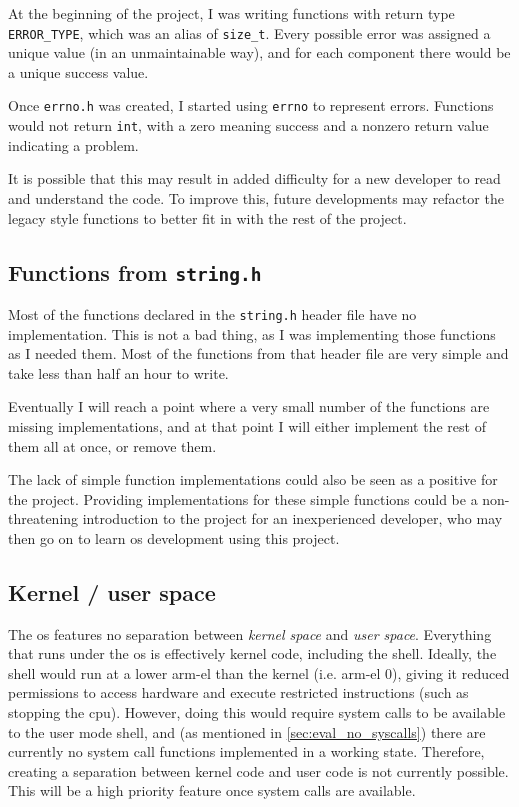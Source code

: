 \documentclass{article}
\begin{document}
At the beginning of the project, I was writing functions with return
type \verb!ERROR_TYPE!, which was an alias of \verb!size_t!. Every possible
error was assigned a unique value (in an unmaintainable way), and for each
component there would be a unique success value.

Once \texttt{errno.h} was created, I started using \texttt{errno} to represent
errors. Functions would not return \texttt{int}, with a zero meaning success
and a nonzero return value indicating a problem.

It is possible that this may result in added difficulty for a new developer to
read and understand the code. To improve this, future developments may refactor
the legacy style functions to better fit in with the rest of the project.

\subsection{Functions from \texttt{string.h}}
Most of the functions declared in the \texttt{string.h} header file have no
implementation. This is not a bad thing, as I was implementing those functions
as I needed them. Most of the functions from that header file are very simple
and take less than half an hour to write.

Eventually I will reach a point where a very small number of the functions are
missing implementations, and at that point I will either implement the rest of
them all at once, or remove them.

The lack of simple function implementations could also be seen as a positive
for the project. Providing implementations for these simple functions could be
a non-threatening introduction to the project for an inexperienced developer,
who may then go on to learn \gls{os} development using this project.

\subsection{Kernel / user space}
The \gls{os} features no separation between \emph{kernel space} and \emph{user
space}. Everything that runs under the \gls{os} is effectively kernel code,
including the shell. Ideally, the shell would run at a lower \gls{arm-el} than
the kernel (i.e. \gls{arm-el} 0), giving it reduced permissions to access
hardware and execute restricted instructions (such as stopping the \gls{cpu}).
However, doing this would require system calls to be available to the user mode
shell, and (as mentioned in \autoref{sec:eval_no_syscalls}) there are currently
no system call functions implemented in a working state. Therefore, creating a
separation between kernel code and user code is not currently possible. This
will be a high priority feature once system calls are available.
\end{document}
